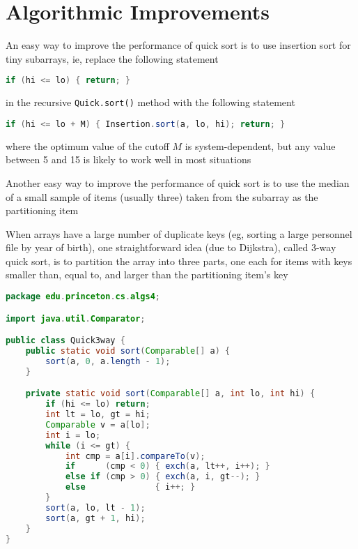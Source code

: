 \documentclass[8pt,a4paper,compress]{beamer}
\begin{document}
\section{Algorithmic Improvements}
\begin{frame}[fragile]
\pause

An easy way to improve the performance of quick sort is to use insertion sort for tiny subarrays, ie, replace the following statement 
\begin{lstlisting}[language=Java]
if (hi <= lo) { return; }
\end{lstlisting}
in the recursive \lstinline{Quick.sort()} method with the following statement
\begin{lstlisting}[language=Java]
if (hi <= lo + M) { Insertion.sort(a, lo, hi); return; }
\end{lstlisting}
where the optimum value of the cutoff $M$ is system-dependent, but any value between 5 and 15 is likely to work well in most situations

\pause
\bigskip

Another easy way to improve the performance of quick sort is to use the median of a small sample of items (usually three) taken from the subarray as the partitioning item
\end{frame}

\begin{frame}[fragile]
\pause

When arrays have a large number of duplicate keys (eg, sorting a large personnel file by year of birth), one straightforward idea (due to Dijkstra), called 3-way quick sort, is to partition the array into three parts, one each for items with keys smaller than, equal to, and larger than the partitioning item's key

\pause

\begin{lstlisting}[language=Java]
package edu.princeton.cs.algs4;

import java.util.Comparator;

public class Quick3way {
    public static void sort(Comparable[] a) {
        sort(a, 0, a.length - 1);
    }

    private static void sort(Comparable[] a, int lo, int hi) { 
        if (hi <= lo) return;
        int lt = lo, gt = hi;
        Comparable v = a[lo];
        int i = lo;
        while (i <= gt) {
            int cmp = a[i].compareTo(v);
            if      (cmp < 0) { exch(a, lt++, i++); }
            else if (cmp > 0) { exch(a, i, gt--); }
            else              { i++; }
        }
        sort(a, lo, lt - 1);
        sort(a, gt + 1, hi);
    }
}
\end{lstlisting}
\end{frame}
\end{document}
